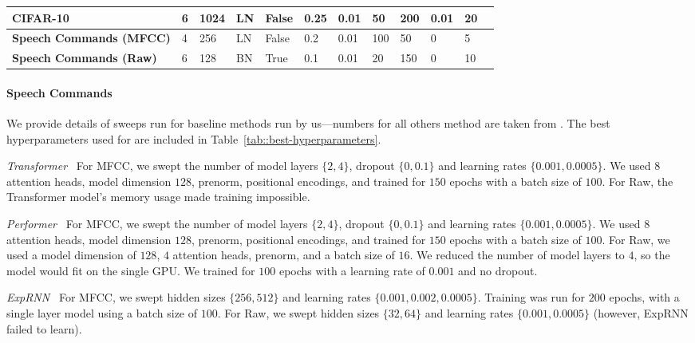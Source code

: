 \begin{table*}[!t]
{\begin{tabular}{@{}llllllllllll@{}}
      \midrule
      \textbf{CIFAR-10}               & 6              & 1024                      & LN            & False             & 0.25          & 0.01     & 50               & 200          & 0.01        & 20                \\
      \midrule
      \textbf{Speech Commands (MFCC)} & 4              & 256                       & LN            & False             & 0.2           & 0.01     & 100              & 50           & 0           & 5                 \\
      \textbf{Speech Commands (Raw)}  & 6              & 128                       & BN            & True              & 0.1           & 0.01     & 20               & 150          & 0           & 10                \\
      \bottomrule
    \end{tabular}%
  }
\end{table*}


\paragraph{Speech Commands}
We provide details of sweeps run for baseline methods run by us---numbers for all others method are taken from \citet{gu2021lssl}. The best hyperparameters used for \methodabbrv{} are included in Table~\ref{tab::best-hyperparameters}.

\textit{Transformer~\citep{vaswani2017attention}} For MFCC, we swept the number of model layers $\{2, 4\}$, dropout $\{0, 0.1\}$ and learning rates $\{0.001, 0.0005\}$. We used $8$ attention heads, model dimension $128$, prenorm, positional encodings, and trained for $150$ epochs with a batch size of $100$. For Raw, the Transformer model's memory usage made training impossible.

\textit{Performer~\citep{choromanski2020rethinking}} For MFCC, we swept the number of model layers $\{2, 4\}$, dropout $\{0, 0.1\}$ and learning rates $\{0.001, 0.0005\}$. We used $8$ attention heads, model dimension $128$, prenorm, positional encodings, and trained for $150$ epochs with a batch size of $100$. For Raw, we used a model dimension of $128$, $4$ attention heads, prenorm, and a batch size of $16$. We reduced the number of model layers to $4$, so the model would fit on the single GPU. We trained for $100$ epochs with a learning rate of $0.001$ and no dropout.

\textit{ExpRNN~\citep{lezcano2019cheap}} For MFCC, we swept hidden sizes $\{256, 512\}$ and learning rates $\{0.001, 0.002, 0.0005\}$. Training was run for $200$ epochs, with a single layer model using a batch size of $100$. For Raw, we swept hidden sizes $\{32, 64\}$ and learning rates $\{0.001, 0.0005\}$ (however, ExpRNN failed to learn).

